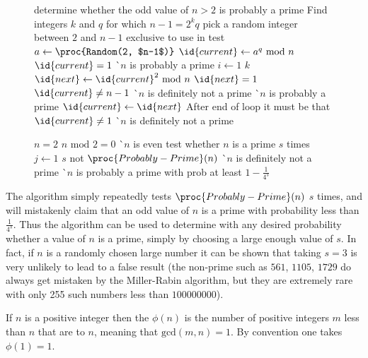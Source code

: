 \begin{figure*}[htb]
\begin{codebox}
\li \Comment determine whether the odd value of $n>2$ is probably a prime
\li Find integers $k$ and $q$ for which $n-1=2^k q$
\li \Comment pick a random integer between $2$ and $n-1$ exclusive to use in test
\li $a \gets \proc{Random(2, $n-1$)}$
\li $\id{current} \gets a^q\mbox{ mod }n$
\li \If $\id{current}=1$ \Then
\li    \Return {} \`\Comment $n$ is probably a prime
    \End
\li \For $i \gets 1$ \To $k$ \Do
\li    $\id{next} \gets \id{current}^2\mbox{ mod }n$
\li    \If $\id{next}=1$ \Then
\li       \If $\id{current}\neq n-1$ \Then
\li          \Return {} \`\Comment $n$ is definitely not a prime
\li       \Else
\li          \Return {} \`\Comment $n$ is probably a prime
          \End
       \End
\li    $\id{current}\gets\id{next}$
    \End
\li \Comment After end of loop it must be that $\id{current}\neq1$
\li \Return {} \`\Comment $n$ is definitely not a prime
\end{codebox}
\begin{codebox}
\li \If $n=2$ \Then
\li    \Return {}
\li  \ElseIf  $n\mbox{ mod }2=0$ \Then
\li    \Return {} \`\Comment $n$ is even
    \End
\li \Comment test whether $n$ is a prime $s$ times
\li \For $j\gets1$ \To $s$ \Do
\li    \If not $\proc{Probably-Prime}(n)$ \Then
\li       \Return {} \`\Comment $n$ is definitely not a prime
       \End
    \End
\li \Return {} \`\Comment $n$ is probably a prime with prob at least $1-\frac{1}{4^s}$
\end{codebox}
\end{figure*}
The  algorithm simply repeatedly tests $\proc{Probably-Prime}(n)$
$s$ times, and will mistakenly claim that an odd value of $n$ is a prime
with probability less than $\frac{1}{4^s}$. Thus the algorithm can be
used to determine with any desired probability whether a value of $n$ is a
prime, simply by choosing a large enough value of $s$.
In fact, if $n$ is a randomly chosen large number it can be shown that
taking $s=3$ is very unlikely to lead to a false result
(the non-prime  such as $561$, $1105$, $1729$
do always get mistaken by the Miller-Rabin algorithm,
but they are extremely rare with only 255 such numbers less than $100000000$).

If $n$ is a positive integer then the  $\phi(n)$
is the number of positive integers $m$ less than $n$ that are
 to $n$, meaning that $\mbox{gcd}(m,n)=1$.
By convention one takes $\phi(1)=1$.


